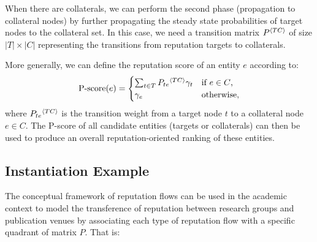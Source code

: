 \documentclass[notitlepage]{svjour3}
\begin{document}
When there are collaterals, we can perform the second phase (propagation to collateral nodes) 
by further propagating the steady state probabilities of target nodes to the collateral set. 
In this case, we need a transition matrix $P{^{\langle TC \rangle}}$ of size $|T|\times |C|$ representing
the transitions from reputation targets to collaterals.

%
More generally, we can define the reputation score of an entity $e$ according to:
\begin{align}\label{eq:pscore}
  \text{P-score}(e) = \begin{cases}
	\sum_{t \in T} P_{te}{^{\langle TC \rangle}} \gamma_t & \text{if $e \in C$,}\\
    \gamma_e &\text{otherwise,}
  \end{cases}
\end{align}
\noindent where $P_{te}{^{\langle TC \rangle}}$ is the transition weight from a target node $t$ to a collateral node $e \in C$. The P-score of all candidate entities (targets or collaterals) can then be used to produce an overall reputation-oriented ranking of these entities.


\subsection{Instantiation Example}\label{sec:example}

The conceptual framework of reputation flows can be used in the academic context
to model the transference of reputation between research groups and 
publication venues by associating each type of reputation flow with a specific quadrant
of matrix $P$. That is:
\end{document}
